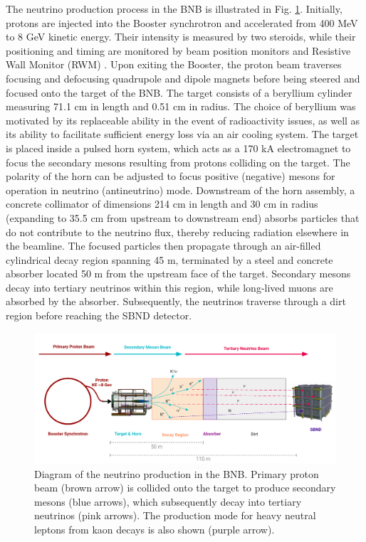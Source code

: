 The neutrino production process in the BNB is illustrated in Fig. \ref{fig:BNBDiagram}.
Initially, protons are injected into the Booster synchrotron and accelerated from 400 MeV to 8 GeV kinetic energy. 
Their intensity is measured by two steroids, while their positioning and timing are monitored by beam position monitors and Resistive Wall Monitor (RWM) \cite{BNBRWM}.
Upon exiting the Booster, the proton beam traverses focusing and defocusing quadrupole and dipole magnets before being steered and focused onto the target of the BNB.
The target consists of a beryllium cylinder measuring 71.1 cm in length and 0.51 cm in radius.
The choice of beryllium was motivated by its replaceable ability in the event of radioactivity issues, as well as its ability to facilitate sufficient energy loss via an air cooling system.
The target is placed inside a pulsed horn system, which acts as a 170 kA electromagnet to focus the secondary mesons resulting from protons colliding on the target.
The polarity of the horn can be adjusted to focus positive (negative) mesons for operation in neutrino (antineutrino) mode. 
Downstream of the horn assembly, a concrete collimator of dimensions 214 cm in length and 30 cm in radius (expanding to 35.5 cm from upstream to downstream end) absorbs particles that do not contribute to the neutrino flux, thereby reducing radiation elsewhere in the beamline.
The focused particles then propagate through an air-filled cylindrical decay region spanning 45 m, terminated by a steel and concrete absorber located 50 m from the upstream face of the target.
Secondary mesons decay into tertiary neutrinos within this region, while long-lived muons are absorbed by the absorber. 
Subsequently, the neutrinos traverse through a dirt region before reaching the SBND detector.

\begin{figure}[htbp] 
\centering    
\includegraphics[width=1.0\textwidth]{BNBDiagram}
\caption[BNBDiagram]{
Diagram of the neutrino production in the BNB.
Primary proton beam (brown arrow) is collided onto the target to produce secondary mesons (blue arrows), which subsequently decay into tertiary neutrinos (pink arrows).
The production mode for heavy neutral leptons from kaon decays is also shown (purple arrow).
}
\label{fig:BNBDiagram}
\end{figure}

